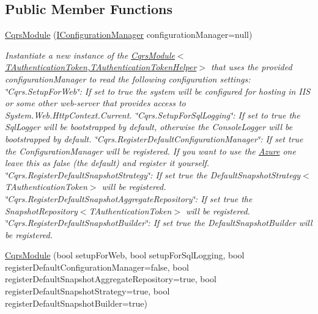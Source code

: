 \subsection*{Public Member Functions}
\begin{DoxyCompactItemize}
\item 
\hyperlink{classCqrs_1_1Ninject_1_1Configuration_1_1CqrsModule_a31a1047d3940842b760ad2a796aa1606_a31a1047d3940842b760ad2a796aa1606}{Cqrs\+Module} (\hyperlink{interfaceCqrs_1_1Configuration_1_1IConfigurationManager}{I\+Configuration\+Manager} configuration\+Manager=null)
\begin{DoxyCompactList}\small\item\em Instantiate a new instance of the \hyperlink{classCqrs_1_1Ninject_1_1Configuration_1_1CqrsModule_a31a1047d3940842b760ad2a796aa1606_a31a1047d3940842b760ad2a796aa1606}{Cqrs\+Module$<$\+T\+Authentication\+Token,\+T\+Authentication\+Token\+Helper$>$} that uses the provided {\itshape configuration\+Manager}  to read the following configuration settings\+: \char`\"{}\+Cqrs.\+Setup\+For\+Web\char`\"{}\+: If set to true the system will be configured for hosting in I\+IS or some other web-\/server that provides access to System.\+Web.\+Http\+Context.\+Current. \char`\"{}\+Cqrs.\+Setup\+For\+Sql\+Logging\char`\"{}\+: If set to true the Sql\+Logger will be bootstrapped by default, otherwise the Console\+Logger will be bootstrapped by default. \char`\"{}\+Cqrs.\+Register\+Default\+Configuration\+Manager\char`\"{}\+: If set true the Configuration\+Manager will be registered. If you want to use the \hyperlink{namespaceCqrs_1_1Ninject_1_1Azure}{Azure} one leave this as false (the default) and register it yourself. \char`\"{}\+Cqrs.\+Register\+Default\+Snapshot\+Strategy\char`\"{}\+: If set true the Default\+Snapshot\+Strategy$<$\+T\+Authentication\+Token$>$ will be registered. \char`\"{}\+Cqrs.\+Register\+Default\+Snapshot\+Aggregate\+Repository\char`\"{}\+: If set true the Snapshot\+Repository$<$\+T\+Authentication\+Token$>$ will be registered. \char`\"{}\+Cqrs.\+Register\+Default\+Snapshot\+Builder\char`\"{}\+: If set true the Default\+Snapshot\+Builder will be registered. \end{DoxyCompactList}\item 
\hyperlink{classCqrs_1_1Ninject_1_1Configuration_1_1CqrsModule_ac17039525e66b01c67a7fb588e241345_ac17039525e66b01c67a7fb588e241345}{Cqrs\+Module} (bool setup\+For\+Web, bool setup\+For\+Sql\+Logging, bool register\+Default\+Configuration\+Manager=false, bool register\+Default\+Snapshot\+Aggregate\+Repository=true, bool register\+Default\+Snapshot\+Strategy=true, bool register\+Default\+Snapshot\+Builder=true)

\end{DoxyCompactItemize}
